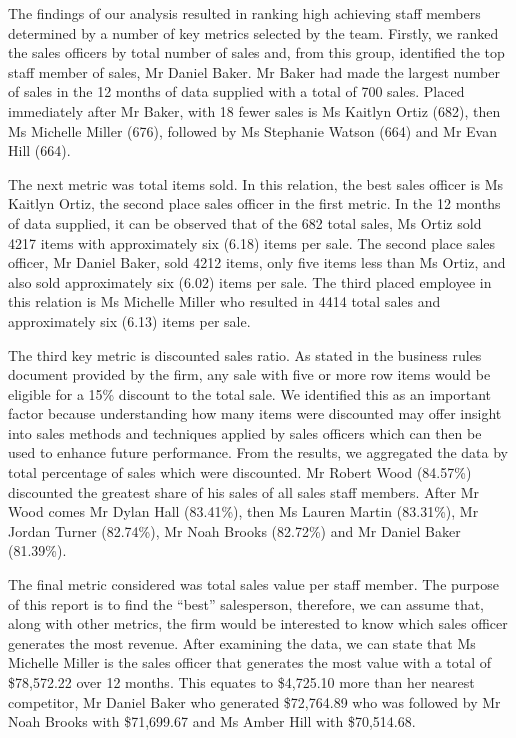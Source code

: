 \documentclass{article}
\begin{document}
    \noindent The findings of our analysis resulted in ranking high achieving staff members
    determined by a number of key metrics selected by the team. Firstly, we ranked the sales
    officers by total number of sales and, from this group, identified the top staff member
    of sales, Mr Daniel Baker. Mr Baker had made the largest number of sales in the 12 months
    of data supplied with a total of 700 sales. Placed immediately after Mr Baker, with 18 fewer
    sales is Ms Kaitlyn Ortiz (682), then Ms Michelle Miller (676), followed by Ms Stephanie
    Watson (664) and Mr Evan Hill (664).
    \vspace{5mm}
    \par\noindent
    
    \noindent The next metric was total items sold. In this relation, the best sales officer
    is Ms Kaitlyn Ortiz, the second place sales officer in the first metric. In the 12 months
    of data supplied, it can be observed that of the 682 total sales, Ms Ortiz sold 4217 items
    with approximately six (6.18) items per sale. The second place sales officer, Mr Daniel
    Baker, sold 4212 items, only five items less than Ms Ortiz, and also sold approximately
    six (6.02) items per sale. The third placed employee in this relation is Ms Michelle Miller
    who resulted in 4414 total sales and approximately six (6.13) items per sale.
    \vspace{5mm}
    \par\noindent

    \noindent The third key metric is discounted sales ratio. As stated in the business rules
    document provided by the firm, any sale with five or more row items would be eligible for
    a 15\% discount to the total sale. We identified this as an important factor because
    understanding how many items were discounted may offer insight into sales methods and
    techniques applied by sales officers which can then be used to enhance future performance.
    From the results, we aggregated the data by total percentage of sales which were discounted.
    Mr Robert Wood (84.57\%) discounted the greatest share of his sales of all sales staff
    members. After Mr Wood comes Mr Dylan Hall (83.41\%), then Ms Lauren Martin (83.31\%), Mr 
    Jordan Turner (82.74\%), Mr Noah Brooks (82.72\%) and Mr Daniel Baker (81.39\%).
    \vspace{5mm}
    \par
    
	\noindent The final metric considered was total sales value per staff member. The purpose
	of this report is to find the ``best'' salesperson, therefore, we can assume that, along
	with other metrics, the firm would be interested to know which sales officer generates
	the most revenue. After examining the data, we can state that Ms Michelle Miller is the sales
	officer that generates the most value with a total of \$78,572.22 over 12 months. This
	equates to \$4,725.10 more than her nearest competitor, Mr Daniel Baker who generated
	\$72,764.89 who was followed by Mr Noah Brooks with \$71,699.67 and Ms Amber Hill with 
	\$70,514.68.
	\vspace{5mm}    
	\par
    
\end{document}
